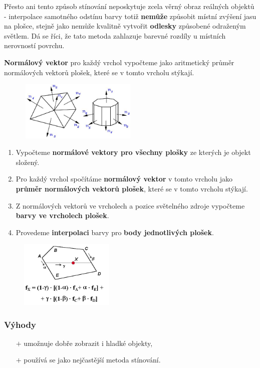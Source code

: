Přesto ani tento způsob stínování neposkytuje zcela věrný obraz reálných objektů - interpolace samotného odstínu barvy totiž \textbf{nemůže} způsobit místní zvýšení jasu na plošce, stejně jako nemůže kvalitně vytvořit \textbf{odlesky} způsobené odraženým světlem. Dá se říci, že tato metoda zahlazuje barevné rozdíly u místních nerovností povrchu.

	\textbf{Normálový vektor} pro každý vrchol vypočteme jako aritmetický průměr normálových vektorů plošek, které se v tomto vrcholu stýkají.
\begin{figure}[H]
\centering
\includegraphics[width=0.5\textwidth]{assets/5_gouraud}
\end{figure}

\begin{enumerate}
	\item Vypočteme \textbf{normálové vektory pro všechny plošky} ze kterých je objekt složený.
	\item Pro každý vrchol spočítáme \textbf{normálový vektor} v tomto vrcholu jako \textbf{průměr normálových vektorů plošek}, které se v tomto vrcholu stýkají.
	\item Z normálových vektorů ve vrcholech a pozice světelného zdroje vypočteme \textbf{barvy ve vrcholech plošek}.
	\item Provedeme \textbf{interpolaci} barvy pro \textbf{body jednotlivých plošek}.
\end{enumerate}
		\begin{figure}[H]
		\centering
		\includegraphics[width=0.4\textwidth]{assets/5_gouradovo}
		\end{figure} 
		\subsubsection*{Výhody}
			\begin{itemize}
				\item[$+$] umožnuje dobře zobrazit i hladké objekty,
				\item[$+$] používá se jako nejčastější metoda stínování.
			\end{itemize}
